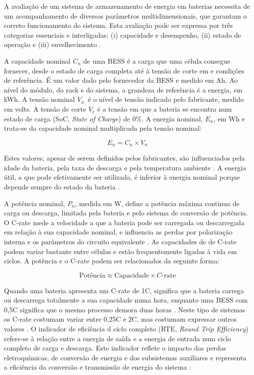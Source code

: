 A avaliação de um sistema de armazenamento de energia em baterias necessita de um acompanhamento de diversos parâmetros multidimensionais, que garantam o correto funcionamento do sistema. Esta avaliação pode ser expressa por três categorias essenciais e interligadas: (i) capacidade e desempenho, (ii) estado de operação e (iii) envelhecimento \cite{Nazaralizadeh2024}\cite{FEMP2023}.



A capacidade nominal $C_n$ de uma BESS é a carga que uma célula consegue fornecer, desde o estado de carga completa até à tensão de corte em e condições de referência. É um valor dado pelo fornecedor da BESS e medido em Ah. Ao nível do módulo, do rack e do sistema, a grandeza de referência é a energia, em kWh. A tensão nominal $V_n$\ é o nível de tensão indicado pelo fabricante, medido em volts. A tensão de corte $V_c$ é a tensão em que a bateria se encontra
num estado de carga (SoC, \textit{State of Charge}) de 0\%. A energia nominal, $E_n$, em Wh e trata-se da capacidade nominal multiplicada pela tensão nominal:


\[
E_n = C_n \times V_n
\]

Estes valores, apesar de serem definidos pelos fabricantes, são influenciados pela idade da bateria, pela taxa de descarga e pela temperatura ambiente \cite{Ashok2022}. A energia útil, a que pode efetivamente ser utilizada, é inferior à energia nominal porque depende sempre do estado da bateria \cite{INTERNATIONALSTANDARDNORMEINTERNATIONALE2017}. 

A potência nominal, $P_n$,  medida em W, define a potência máxima continua de carga ou descarga, limitada pela bateria e pelo sistema de conversão de potência. 
O C-rate mede a velocidade a que a bateria pode ser carregada ou descarregada em relação à sua capacidade nominal, e influencia as perdas por polarização interna e os parâmetros do circuito equivalente \cite{ Allahham2022}. As capacidades de de C-rate podem variar bastante entre células e estão frequentemente ligadas à vida em ciclos.  A potência e o C-rate podem ser relacionados da seguinte forma:

\[
\text{Potência} \approx \text{Capacidade} \times C\text{-rate}
\]

Quando uma bateria apresenta um C-rate de 1C, significa que a bateria carrega ou descarrega totalmente a sua capacidade numa hora, enquanto uma BESS com 0,5C significa que o mesmo processo demora duas horas \cite{TLS}.  Neste tipo de sistemas os C-rate costumam variar entre 0,25C e 2C, mas costumam expressar outros valores \cite{Power}.
O indicador de eficiência d ciclo completo (RTE, \textit{Round Trip Efficiency}) refere-se à relação entre a energia de saída e a energia de entrada num ciclo completo de carga e descarga. Este indicador reflete o impacto das perdas eletroquímicas, de conversão de energia e dos subsistemas auxiliares e representa a eficiência da conversão e transmissão de energia do sistema \cite{ Kyeremeh2026}:


